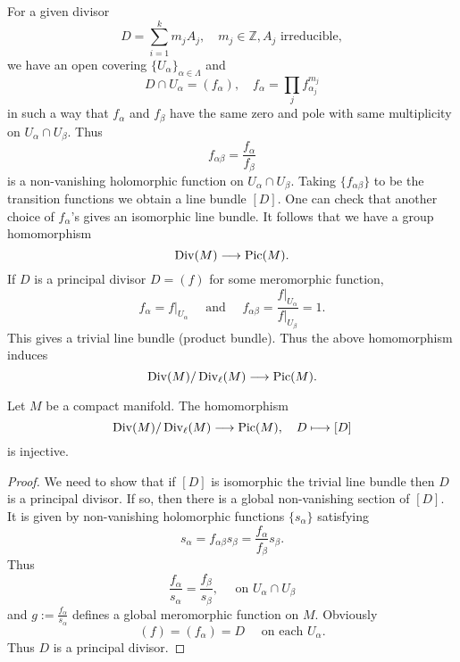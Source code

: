 \documentclass[12pt]{article}
\begin{document}
For a given divisor \[
  D=\sum_{i=1}^{k}m_j A_j,\quad m_j \in \mathbb{Z},A_j\text{ irreducible}
,\] we have an open covering \(\{U_\alpha\}_{\alpha\in\Lambda}\) and \[
  D\cap U_\alpha=(f_\alpha),\quad f_\alpha=\prod_{j}f_{\alpha_j}^{m_j}
\] in such a way that \(f_\alpha\) and \(f_\beta\) have the same zero and pole with
same multiplicity on \(U_\alpha\cap U_\beta\). Thus \[
  f_{\alpha\beta}=\frac{f_\alpha}{f_\beta}
\] is a non-vanishing holomorphic function on \(U_\alpha\cap U_\beta\).
Taking \(\{f_{\alpha\beta}\}\) to be the transition functions we obtain a line bundle
\([D]\). One can check that another choice of \(f_\alpha\)'s gives an isomorphic
line bundle. It follows that we have a group homomorphism \[
  \operatorname{Div}(M)\longrightarrow \operatorname{Pic}(M)
.\] If \(D\) is a principal divisor \(D=(f)\) for some meromorphic function, \[
  f_\alpha=f\big|_{U_\alpha}\quad\text{ and }\quad
  f_{\alpha\beta}=\frac{f\big|_{U_\alpha}}{f\big|_{U_\beta}}=1
.\] This gives a trivial line bundle (product bundle). Thus the above homomorphism
induces \[
  \operatorname{Div}(M)/\operatorname{Div}_\ell(M)\longrightarrow \operatorname{Pic}(M)
.\] 
\begin{theorem}
  Let \(M\) be a compact manifold. The homomorphism \[
    \operatorname{Div}(M)/\operatorname{Div}_\ell(M)\longrightarrow \operatorname{Pic}(M),\quad D\longmapsto [D]
  \] is injective.
\end{theorem}
\begin{proof}
  We need to show that if \([D]\) is isomorphic the trivial line bundle then \(D\) is
  a principal divisor. If so, then there is a global non-vanishing section of \([D]\).
  It is given by non-vanishing holomorphic functions \(\{s_\alpha\}\) satisfying \[
    s_\alpha=f_{\alpha\beta}s_\beta=\frac{f_\alpha}{f_\beta}s_\beta
  .\] Thus \[
    \frac{f_\alpha}{s_\alpha}=\frac{f_\beta}{s_\beta},\quad
    \text{ on }U_\alpha\cap U_\beta
  \] and \(g:=\frac{f_\alpha}{s_\alpha}\) defines a global meromorphic function on
  \(M\). Obviously \[
    (f)=(f_\alpha)=D\quad\text{ on each }U_\alpha
  .\] Thus \(D\) is a principal divisor.
\end{proof}
\end{document}
